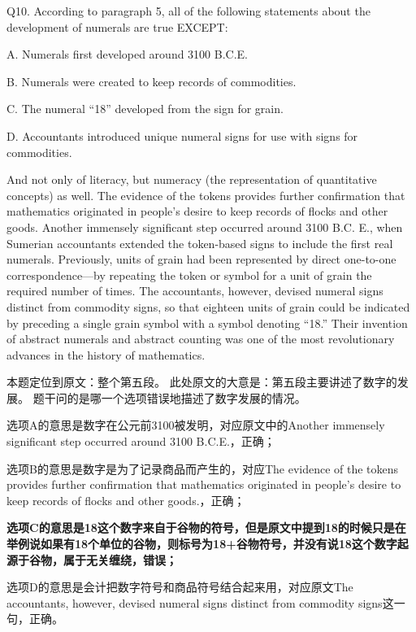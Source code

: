 \begin{blk}
    \begin{qst}
        Q10.
        According to paragraph 5, all of the following statements about the development of numerals are true EXCEPT:
    \end{qst}

    \begin{chc}
        A.
        Numerals first developed around 3100 B.C.E.

        B.
        Numerals were created to keep records of commodities.

        C.
        The numeral “18” developed from the sign for grain.

        D.
        Accountants introduced unique numeral signs for use with signs for commodities.
    \end{chc}

    \begin{psgq}
        And not only of literacy, but numeracy (the representation of quantitative concepts) as well. The evidence of the tokens provides further confirmation that mathematics originated in people’s desire to keep records of flocks and other goods. Another immensely significant step occurred around 3100 B.C. E., when Sumerian accountants extended the token-based signs to include the first real numerals. Previously, units of grain had been represented by direct one-to-one correspondence—by repeating the token or symbol for a unit of grain the required number of times. The accountants, however, devised numeral signs distinct from commodity signs, so that eighteen units of grain could be indicated by preceding a single grain symbol with a symbol denoting “18.” Their invention of abstract numerals and abstract counting was one of the most revolutionary advances in the history of mathematics.
    \end{psgq}

    \begin{nlz}
        本题定位到原文：整个第五段。 此处原文的大意是：第五段主要讲述了数字的发展。 题干问的是哪一个选项错误地描述了数字发展的情况。

        选项A的意思是数字在公元前3100被发明，对应原文中的Another immensely significant step occurred around 3100 B.C.E.，正确；

        选项B的意思是数字是为了记录商品而产生的，对应The evidence of the tokens provides further confirmation that mathematics originated in people’s desire to keep records of flocks and other goods.，正确；

        \textbf{选项C的意思是18这个数字来自于谷物的符号，但是原文中提到18的时候只是在举例说如果有18个单位的谷物，则标号为18+谷物符号，并没有说18这个数字起源于谷物，属于无关缠绕，错误；}

        选项D的意思是会计把数字符号和商品符号结合起来用，对应原文The accountants, however, devised numeral signs distinct from commodity signs这一句，正确。
    \end{nlz}
\end{blk}

